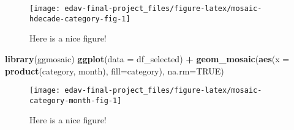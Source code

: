\documentclass[]{book}
\newenvironment{Shaded}{\begin{snugshade}}{\end{snugshade}}
\newcommand{\DataTypeTok}[1]{\textcolor[rgb]{0.13,0.29,0.53}{#1}}
\newcommand{\KeywordTok}[1]{\textcolor[rgb]{0.13,0.29,0.53}{\textbf{#1}}}
\newcommand{\NormalTok}[1]{#1}
\newcommand{\OperatorTok}[1]{\textcolor[rgb]{0.81,0.36,0.00}{\textbf{#1}}}
\newcommand{\OtherTok}[1]{\textcolor[rgb]{0.56,0.35,0.01}{#1}}
\newcommand{\StringTok}[1]{\textcolor[rgb]{0.31,0.60,0.02}{#1}}
\begin{document}
\begin{figure}

{\centering \texttt{[image: edav-final-project\_files/figure-latex/mosaic-hdecade-category-fig-1]} 

}

\caption{Here is a nice figure!}\label{fig:mosaic-hdecade-category-fig}
\end{figure}

\begin{Shaded}
\begin{Highlighting}[]
\KeywordTok{library}\NormalTok{(ggmosaic)}
\KeywordTok{ggplot}\NormalTok{(}\DataTypeTok{data =}\NormalTok{ df_selected) }\OperatorTok{+}
\StringTok{   }\KeywordTok{geom_mosaic}\NormalTok{(}\KeywordTok{aes}\NormalTok{(}\DataTypeTok{x =} \KeywordTok{product}\NormalTok{(category, month), }\DataTypeTok{fill=}\NormalTok{category), }\DataTypeTok{na.rm=}\OtherTok{TRUE}\NormalTok{)}
\end{Highlighting}
\end{Shaded}

\begin{figure}

{\centering \texttt{[image: edav-final-project\_files/figure-latex/mosaic-category-month-fig-1]} 

}

\caption{Here is a nice figure!}\label{fig:mosaic-category-month-fig}
\end{figure}

\begin{Shaded}
\end{Shaded}
\end{document}
